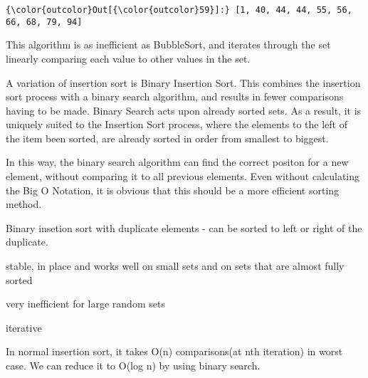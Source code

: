 \documentclass[11pt]{article}
\begin{document}
\begin{Verbatim}[commandchars=\\\{\}]
{\color{outcolor}Out[{\color{outcolor}59}]:} [1, 40, 44, 44, 55, 56, 66, 68, 79, 94]
\end{Verbatim}
            
    This algorithm is as inefficient as BubbleSort, and iterates through the
set linearly comparing each value to other values in the set.

A variation of insertion sort is Binary Insertion Sort. This combines
the insertion sort process with a binary search algorithm, and results
in fewer comparisons having to be made. Binary Search acts upon already
sorted sets. As a result, it is uniquely suited to the Insertion Sort
process, where the elements to the left of the item been sorted, are
already sorted in order from smallest to biggest.

In this way, the binary search algorithm can find the correct positon
for a new element, without comparing it to all previous elements. Even
without calculating the Big O Notation, it is obvious that this should
be a more efficient sorting method.

    Binary insetion sort with duplicate elements - can be sorted to left or
right of the duplicate.

stable, in place and works well on small sets and on sets that are
almost fully sorted

very inefficient for large random sets

iterative

In normal insertion sort, it takes O(n) comparisons(at nth iteration) in
worst case. We can reduce it to O(log n) by using binary search.
\end{document}
